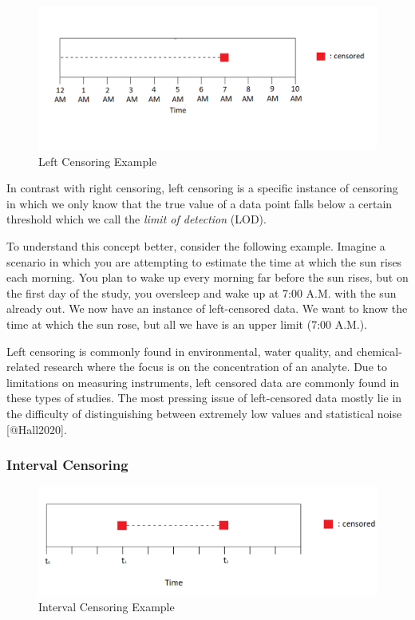 \documentclass[
]{article}
\begin{document}
\begin{figure}
\includegraphics[width=1\linewidth]{figures/left_censoring_example_fix} \caption{Left Censoring Example}\label{fig:leftcensoringexample}
\end{figure}

In contrast with right censoring, left censoring is a specific instance
of censoring in which we only know that the true value of a data point
falls below a certain threshold which we call the \emph{limit of
detection} (LOD).

To understand this concept better, consider the following example.
Imagine a scenario in which you are attempting to estimate the time at
which the sun rises each morning. You plan to wake up every morning far
before the sun rises, but on the first day of the study, you oversleep
and wake up at 7:00 A.M. with the sun already out. We now have an
instance of left-censored data. We want to know the time at which the
sun rose, but all we have is an upper limit (7:00 A.M.).

Left censoring is commonly found in environmental, water quality, and
chemical-related research where the focus is on the concentration of an
analyte. Due to limitations on measuring instruments, left censored data
are commonly found in these types of studies. The most pressing issue of
left-censored data mostly lie in the difficulty of distinguishing
between extremely low values and statistical noise {[}@Hall2020{]}.

\hypertarget{interval}{%
\subsubsection{Interval Censoring}\label{interval}}

\begin{figure}
\includegraphics[width=1\linewidth]{figures/interval_censoring_example_fix} \caption{Interval Censoring Example}\label{fig:intervalcensoringexample}
\end{figure}
\end{document}
